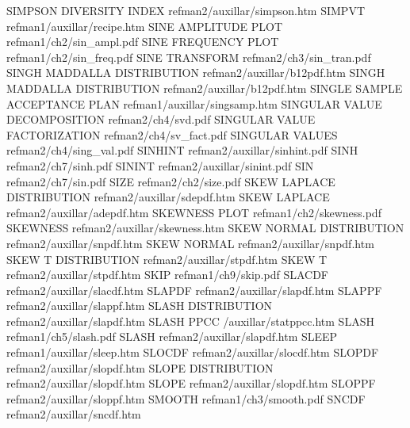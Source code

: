 SIMPSON DIVERSITY INDEX                 refman2/auxillar/simpson.htm
SIMPVT                                  refman1/auxillar/recipe.htm
SINE AMPLITUDE PLOT                     refman1/ch2/sin_ampl.pdf
SINE FREQUENCY PLOT                     refman1/ch2/sin_freq.pdf
SINE TRANSFORM                          refman2/ch3/sin_tran.pdf
SINGH MADDALLA DISTRIBUTION             refman2/auxillar/b12pdf.htm
SINGH MADDALLA DISTRIBUTION             refman2/auxillar/b12pdf.htm
SINGLE SAMPLE ACCEPTANCE PLAN           refman1/auxillar/singsamp.htm
SINGULAR VALUE DECOMPOSITION            refman2/ch4/svd.pdf
SINGULAR VALUE FACTORIZATION            refman2/ch4/sv_fact.pdf
SINGULAR VALUES                         refman2/ch4/sing_val.pdf
SINHINT                                 refman2/auxillar/sinhint.pdf
SINH                                    refman2/ch7/sinh.pdf
SININT                                  refman2/auxillar/sinint.pdf
SIN                                     refman2/ch7/sin.pdf
SIZE                                    refman2/ch2/size.pdf
SKEW LAPLACE DISTRIBUTION               refman2/auxillar/sdepdf.htm
SKEW LAPLACE                            refman2/auxillar/adepdf.htm
SKEWNESS PLOT                           refman1/ch2/skewness.pdf
SKEWNESS                                refman2/auxillar/skewness.htm
SKEW NORMAL DISTRIBUTION                refman2/auxillar/snpdf.htm
SKEW NORMAL                             refman2/auxillar/snpdf.htm
SKEW T DISTRIBUTION                     refman2/auxillar/stpdf.htm
SKEW T                                  refman2/auxillar/stpdf.htm
SKIP                                    refman1/ch9/skip.pdf
SLACDF                                  refman2/auxillar/slacdf.htm
SLAPDF                                  refman2/auxillar/slapdf.htm
SLAPPF                                  refman2/auxillar/slappf.htm
SLASH DISTRIBUTION                      refman2/auxillar/slapdf.htm
SLASH PPCC                              /auxillar/statppcc.htm
SLASH                                   refman1/ch5/slash.pdf
SLASH                                   refman2/auxillar/slapdf.htm
SLEEP                                   refman1/auxillar/sleep.htm
SLOCDF                                  refman2/auxillar/slocdf.htm
SLOPDF                                  refman2/auxillar/slopdf.htm
SLOPE DISTRIBUTION                      refman2/auxillar/slopdf.htm
SLOPE                                   refman2/auxillar/slopdf.htm
SLOPPF                                  refman2/auxillar/sloppf.htm
SMOOTH                                  refman1/ch3/smooth.pdf
SNCDF                                   refman2/auxillar/sncdf.htm
